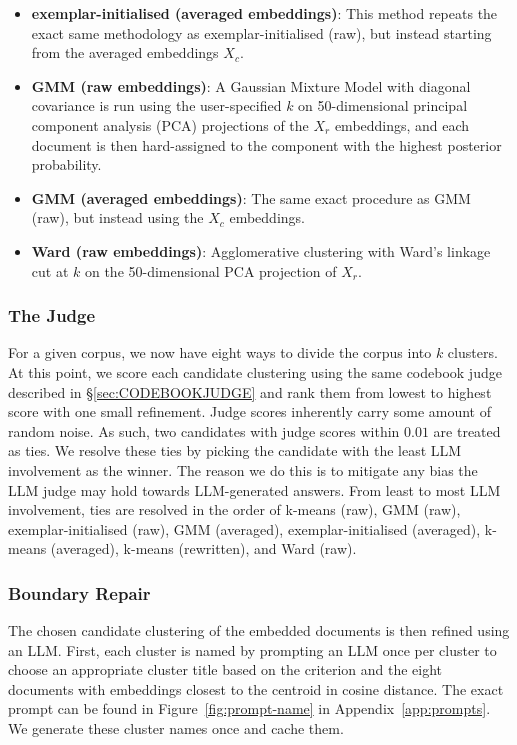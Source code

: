 \documentclass[11pt,a4paper,oneside]{report}
\begin{document}
\begin{itemize}
\item\textbf{exemplar-initialised (averaged embeddings)}: This method repeats the exact same methodology as exemplar-initialised (raw), but instead starting from the averaged embeddings $X_c$.
\item \textbf{GMM (raw embeddings)}: A Gaussian Mixture Model with diagonal covariance is run using the user-specified $k$ on 50-dimensional principal component analysis (PCA) projections of the $X_r$ embeddings, and each document is then hard-assigned to the component with the highest posterior probability.
\item \textbf{GMM (averaged embeddings)}: The same exact procedure as GMM (raw), but instead using the $X_c$ embeddings.
\item \textbf{Ward (raw embeddings)}: Agglomerative clustering with Ward's linkage cut at $k$ on the 50-dimensional PCA projection of $X_r$.
\end{itemize}

\subsubsection{The Judge}

For a given corpus, we now have eight ways to divide the corpus into $k$ clusters. At this point, we score each candidate clustering using the same codebook judge described in \S\ref{sec:CODEBOOKJUDGE} and rank them from lowest to highest score with one small refinement. Judge scores inherently carry some amount of random noise. As such, two candidates with judge scores within $0.01$ are treated as ties. We resolve these ties by picking the candidate with the least LLM involvement as the winner. The reason we do this is to mitigate any bias the LLM judge may hold towards LLM-generated answers. From least to most LLM involvement, ties are resolved in the order of k-means (raw), GMM (raw), exemplar-initialised (raw), GMM (averaged), exemplar-initialised (averaged), k-means (averaged), k-means (rewritten), and Ward (raw).

\subsubsection{Boundary Repair}

The chosen candidate clustering of the embedded documents is then refined using an LLM. First, each cluster is named by prompting an LLM once per cluster to choose an appropriate cluster title based on the criterion and the eight documents with embeddings closest to the centroid in cosine distance. The exact prompt can be found in Figure~\ref{fig:prompt-name} in Appendix~\ref{app:prompts}. We generate these cluster names once and cache them.
\end{document}
